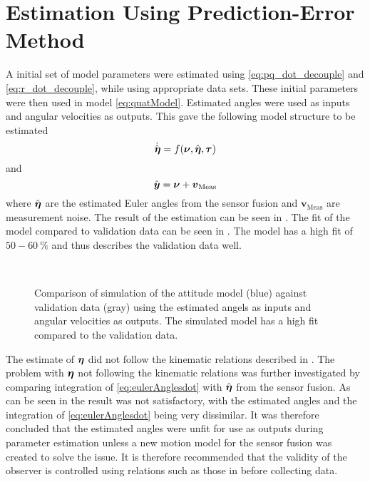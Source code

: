 \section{Estimation Using Prediction-Error Method}  
A initial set of model parameters were estimated using \eqref{eq:pq_dot_decouple} and \eqref{eq:r_dot_decouple}, while using appropriate data sets. These initial parameters were then used in model \eqref{eq:quatModel}. Estimated angles were used as inputs and angular velocities as outputs. This gave the following model structure to be estimated
\begin{equation}
\dot{\hat{\boldsymbol{\eta}}} = f(\boldsymbol{\nu}, \hat{\boldsymbol{\eta}}, \boldsymbol{\tau})
\end{equation}
and
\begin{equation}
\hat{\boldsymbol{y}} = \boldsymbol{\nu} + \boldsymbol{v}_{\text{Meas}}
\end{equation}
where $\hat{\boldsymbol{\eta}}$ are the estimated Euler angles from the sensor fusion and $\boldsymbol{v}_{\text{Meas}}$ are measurement noise.
The result of the estimation can be seen in .  The fit of the model compared to validation data can be seen in . The model has a high fit of $50-60\ \%$ and thus describes the validation data well.
\begin{figure}[tbp]
  \centering
  \qquad
  \\
  \caption{\label{fig:velocityCompareCong}%
    Comparison of simulation of the attitude model (blue) against validation data (gray) using the estimated angels as inputs and angular velocities as outputs. The simulated model has a high fit compared to the validation data.}
\end{figure}

The estimate of $\boldsymbol{\eta}$ did not follow the kinematic relations described in . The problem with $\boldsymbol{\eta}$ not following the kinematic relations was further investigated by comparing integration of \eqref{eq:eulerAnglesdot} with $\hat{\boldsymbol{\eta}}$ from the sensor fusion. As can be seen in  the result was not satisfactory, with the estimated angles and the integration of \eqref{eq:eulerAnglesdot} being very dissimilar. It was therefore concluded that the estimated angles were unfit for use as outputs during parameter estimation unless a new motion model for the sensor fusion was created to solve the issue. It is therefore recommended that the validity of the observer is controlled using relations such as those in  before collecting data. 

